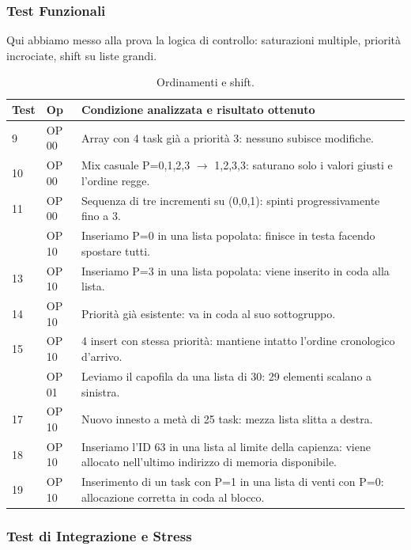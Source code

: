 \documentclass[a4paper,12pt]{article}
\begin{document}
\newpage
\subsubsection{Test Funzionali}

Qui abbiamo messo alla prova la logica di controllo: saturazioni multiple, priorità incrociate, shift su liste grandi.

\begin{table}[H]
\centering
\small
\begin{tabular}{@{}llp{8cm}@{}}
\toprule
\textbf{Test} & \textbf{Op} & \textbf{Condizione analizzata e risultato ottenuto} \\
\midrule
9  & OP 00 & Array con 4 task già a priorità 3: nessuno subisce modifiche. \\
10 & OP 00 & Mix casuale P=0,1,2,3 $\rightarrow$ 1,2,3,3: saturano solo i valori giusti e l'ordine regge. \\
11 & OP 00 & Sequenza di tre incrementi su (0,0,1): spinti progressivamente fino a 3. \\
\addlinespace
12 & OP 10 & Inseriamo P=0 in una lista popolata: finisce in testa facendo spostare tutti. \\
13 & OP 10 & Inseriamo P=3 in una lista popolata: viene inserito in coda alla lista. \\
14 & OP 10 & Priorità già esistente: va in coda al suo sottogruppo. \\
15 & OP 10 & 4 insert con stessa priorità: mantiene intatto l'ordine cronologico d'arrivo. \\
\addlinespace
16 & OP 01 & Leviamo il capofila da una lista di 30: 29 elementi scalano a sinistra. \\
17 & OP 10 & Nuovo innesto a metà di 25 task: mezza lista slitta a destra. \\
18 & OP 10 & Inseriamo l'ID 63 in una lista al limite della capienza: viene allocato nell'ultimo indirizzo di memoria disponibile. \\
19 & OP 10 & Inserimento di un task con P=1 in una lista di venti con P=0: allocazione corretta in coda al blocco. \\
\bottomrule
\end{tabular}
\caption{Ordinamenti e shift.}
\label{tab:test_funz}
\end{table}

\newpage
\subsubsection{Test di Integrazione e Stress}
\end{document}
